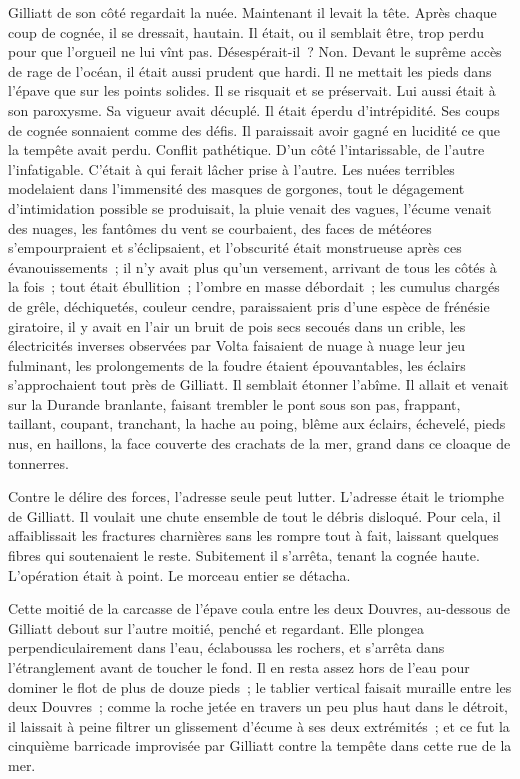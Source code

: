 \documentclass[french,twoside]{book} %
\begin{document}
Gilliatt de son côté regardait la nuée. Maintenant il levait la tête. Après chaque coup de cognée, il se dressait, hautain. Il était, ou il semblait être, trop perdu pour que l’orgueil ne lui vînt pas. Désespérait-il ? Non. Devant le suprême accès de rage de l’océan, il était aussi prudent que hardi. Il ne mettait les pieds dans l’épave que sur les points solides. Il se risquait et se préservait. Lui aussi était à son paroxysme. Sa vigueur avait décuplé. Il était éperdu d’intrépidité. Ses coups de cognée sonnaient comme des défis. Il paraissait avoir gagné en lucidité ce que la tempête avait perdu. Conflit pathétique. D’un côté l’intarissable, de l’autre l’infatigable. C’était à qui ferait lâcher prise à l’autre. Les nuées terribles modelaient dans l’immensité des masques de gorgones, tout le dégagement d’intimidation possible se produisait, la pluie venait des vagues, l’écume venait des nuages, les fantômes du vent se courbaient, des faces de météores s’empourpraient et s’éclipsaient, et l’obscurité était monstrueuse après ces évanouissements ; il n’y avait plus qu’un versement, arrivant de tous les côtés à la fois ; tout était ébullition ; l’ombre en masse débordait ; les cumulus chargés de grêle, déchiquetés, couleur cendre, paraissaient pris d’une espèce de frénésie giratoire, il y avait en l’air un bruit de pois secs secoués dans un crible, les électricités inverses observées par Volta faisaient de nuage à nuage leur jeu fulminant, les prolongements de la foudre étaient épouvantables, les  éclairs s’approchaient tout près de Gilliatt. Il semblait étonner l’abîme. Il allait et venait sur la Durande branlante, faisant trembler le pont sous son pas, frappant, taillant, coupant, tranchant, la hache au poing, blême aux éclairs, échevelé, pieds nus, en haillons, la face couverte des crachats de la mer, grand dans ce cloaque de tonnerres.\par
Contre le délire des forces, l’adresse seule peut lutter. L’adresse était le triomphe de Gilliatt. Il voulait une chute ensemble de tout le débris disloqué. Pour cela, il affaiblissait les fractures charnières sans les rompre tout à fait, laissant quelques fibres qui soutenaient le reste. Subitement il s’arrêta, tenant la cognée haute. L’opération était à point. Le morceau entier se détacha.\par
Cette moitié de la carcasse de l’épave coula entre les deux Douvres, au-dessous de Gilliatt debout sur l’autre moitié, penché et regardant. Elle plongea perpendiculairement dans l’eau, éclaboussa les rochers, et s’arrêta dans l’étranglement avant de toucher le fond. Il en resta assez hors de l’eau pour dominer le flot de plus de douze pieds ; le tablier vertical faisait muraille entre les deux Douvres ; comme la roche jetée en travers un peu plus haut dans le détroit, il laissait à peine filtrer un glissement d’écume à ses deux extrémités ; et ce fut la cinquième barricade improvisée par Gilliatt contre la tempête dans cette rue de la mer.\par
\end{document}
